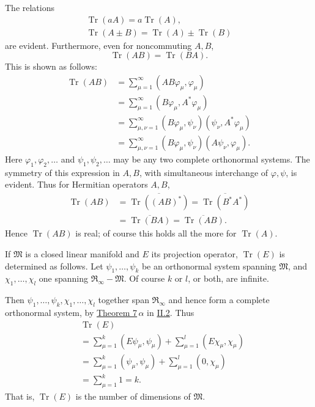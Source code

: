 \documentclass[fontsize=13pt,twoside,openany,headings=normal,parskip=false,bookmarkpackage=false,DIV=calc]{scrbook}
\begin{document}
The relations
\begin{gather*}
\operatorname{Tr}(aA)=a\operatorname{Tr}(A),\\
\operatorname{Tr}(A\pm B)=\operatorname{Tr}(A)\pm\operatorname{Tr}(B)
\end{gather*}
are evident. Furthermore, even for noncommuting $A,B$,
\[
\operatorname{Tr}(AB)=\operatorname{Tr}(BA).
\]
This is shown as follows:
\begin{align*}
\operatorname{Tr}(AB)
&=\sum_{\mu=1}^\infty(AB\varphi_\mu,\varphi_\mu)\\
&=\sum_{\mu=1}^\infty(B\varphi_\mu,A^*\varphi_\mu)\\
&=\sum_{\mu,\nu=1}^\infty(B\varphi_\mu,\psi_\nu)(\psi_\nu,A^*\varphi_\mu)\\
&=\sum_{\mu,\nu=1}^\infty(B\varphi_\mu,\psi_\nu)(A\psi_\nu,\varphi_\mu).
\end{align*}
Here $\varphi_1,\varphi_2,\ldots$ and $\psi_1,\psi_2,\ldots$ may be any two complete orthonormal systems. The symmetry of this expression in $A,B$, with simultaneous interchange of $\varphi,\psi$, is evident. Thus for Hermitian operators $A,B$,
\begin{align*}
\operatorname{Tr}(AB)
&=\overline{\operatorname{Tr}((AB)^*)}
=\overline{\operatorname{Tr}(B^*A^*)}\\
&=\overline{\operatorname{Tr}(BA)}
=\overline{\operatorname{Tr}(AB)}.
\end{align*}
Hence $\operatorname{Tr}(AB)$ is real; of course this holds all the more for $\operatorname{Tr}(A)$.

If $\mathfrak M$ is a closed linear manifold and $E$ its projection operator, $\operatorname{Tr}(E)$ is determined as follows. Let $\psi_1,\ldots,\psi_k$ be an orthonormal system spanning $\mathfrak M$, and $\chi_1,\ldots,\chi_l$ one spanning $\mathfrak R_\infty-\mathfrak M$. Of course $k$ or $l$, or both, are infinite.

\hypertarget{origpage-95}{}%
Then $\psi_1,\ldots,\psi_k,\chi_1,\ldots,\chi_l$ together span $\mathfrak R_\infty$ and hence form a complete orthonormal system, by \hyperref[thm:II.7]{Theorem 7}\,$\alpha$ in \hyperref[sec:II.2]{II.2}. Thus
\begin{align*}
&\operatorname{Tr}(E)\\
&=\sum_{\mu=1}^k(E\psi_\mu,\psi_\mu)+\sum_{\mu=1}^l(E\chi_\mu,\chi_\mu)\\
&=\sum_{\mu=1}^k(\psi_\mu,\psi_\mu)+\sum_{\mu=1}^l(0,\chi_\mu)\\
&=\sum_{\mu=1}^k1=k.
\end{align*}
That is, $\operatorname{Tr}(E)$ is the number of dimensions of $\mathfrak M$.
\end{document}
